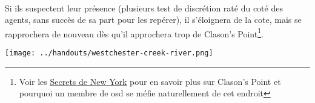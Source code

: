 \documentclass[a4paper,10pt]{article}
\begin{document}
\paragraph{} Si ils suspectent leur présence (plusieurs test de discrétion raté du coté des agents, sans succès de sa part pour les repérer), il 
s'éloignera de la cote, mais se rapprochera de nouveau dès qu'il approchera trop de Clason's Point\footnote{Voir les 
\href{http://www.tentacules.net/index.php?id=1180}{Secrets de New York} pour en savoir plus sur Clason's Point et pourquoi un membre de \gls{osd}
se méfie naturellement de cet endroit}.

\begin{center}
 \texttt{[image: ../handouts/westchester-creek-river.png]}
\end{center}

\printglossaries
\end{document}

